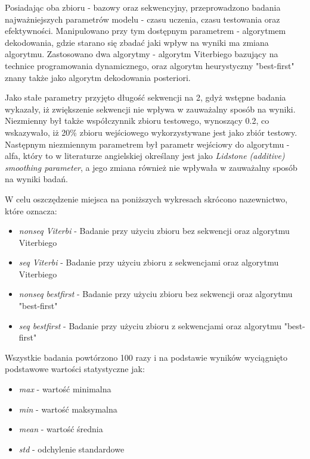 \par
\bigskip

Posiadając oba zbioru - bazowy oraz sekwencyjny, przeprowadzono badania najważniejszych parametrów modelu - czasu uczenia, czasu testowania oraz efektywności. Manipulowano przy tym dostępnym parametrem - algorytmem dekodowania, gdzie starano się zbadać jaki wpływ na wyniki ma zmiana algorytmu. Zastosowano dwa algorytmy - algorytm Viterbiego bazujący na technice programowania dynamicznego, oraz algorytm heurystyczny "best-first" znany także jako algorytm dekodowania posteriori.

Jako stałe parametry przyjęto długość sekwencji na 2, gdyż wstępne badania wykazały, iż zwiększenie sekwencji nie wpływa w zauważalny sposób na wyniki. Niezmienny był także współczynnik zbioru testowego, wynoszący 0.2, co wskazywało, iż 20\% zbioru wejściowego wykorzystywane jest jako zbiór testowy. Następnym niezmiennym parametrem był parametr wejściowy do algorytmu - alfa, który to w literaturze angielskiej określany jest jako \textit{Lidstone (additive) smoothing parameter}, a jego zmiana również nie wpływała w zauważalny sposób na wyniki badań.

W celu oszczędzenie miejsca na poniższych wykresach skrócono nazewnictwo, które oznacza:

\begin{itemize}
  \item \textit{nonseq Viterbi} - Badanie przy użyciu zbioru bez sekwencji oraz algorytmu Viterbiego
  \item \textit{seq Viterbi} - Badanie przy użyciu zbioru z sekwencjami oraz algorytmu Viterbiego
  \item \textit{nonseq bestfirst} - Badanie przy użyciu zbioru bez sekwencji oraz algorytmu "best-first"
  \item \textit{seq bestfirst} - Badanie przy użyciu zbioru z sekwencjami oraz algorytmu "best-first"
\end{itemize}

Wszystkie badania powtórzono 100 razy i na podstawie wyników wyciągnięto podstawowe wartości statystyczne jak:

\begin{itemize}
  \item \textit{max} - wartość minimalna
  \item \textit{min} - wartość maksymalna
  \item \textit{mean} - wartość średnia
  \item \textit{std} - odchylenie standardowe
\end{itemize}

